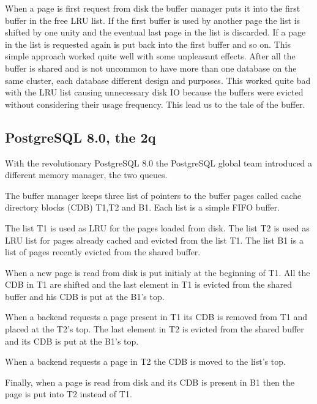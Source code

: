 When a page is first request from disk the buffer manager puts it into the first buffer in the free LRU 
list. If the first buffer is used by another page the list is shifted by one unity and the eventual last 
page in the list is discarded. If a page in the list is requested again is put back into the first buffer 
and so on. This simple approach worked quite well with some unpleasant effects. After all the buffer is 
shared and is not uncommon to have more than one database on the same cluster, each database different 
design and purposes. This worked quite bad with the LRU list causing unnecessary disk IO because the 
buffers were evicted without considering their usage frequency. This lead us to the tale of the buffer.


\subsection{PostgreSQL 8.0, the 2q}
With the revolutionary PostgreSQL 8.0 the PostgreSQL global team introduced a different memory manager, the two 
queues.\newline 

The buffer manager keeps three list of pointers to the buffer pages called cache directory blocks (CDB) T1,T2 and 
B1. Each list is a simple FIFO buffer.\newline

The list T1 is used as LRU for the pages loaded from disk. The list T2 is used as LRU list for pages already cached 
and evicted from the list T1. The list B1 is a list of pages recently evicted from the shared buffer.

When a new page is read from disk is put initialy at the beginning of T1. All the CDB in T1 are shifted and the 
last element in T1 is evicted from the shared buffer and his CDB is put at the B1's top.\newline 

When a backend requests a page present in T1 its CDB is removed from T1 and placed at the T2's top. The last 
element in T2 is  evicted from the shared buffer and its CDB is put at the B1's top.\newline

When a backend requests a page in T2 the CDB is moved to the list's top.\newline

Finally, when a page is read from disk and its CDB is present in B1 then the page is put into T2 instead of 
T1.\newline

